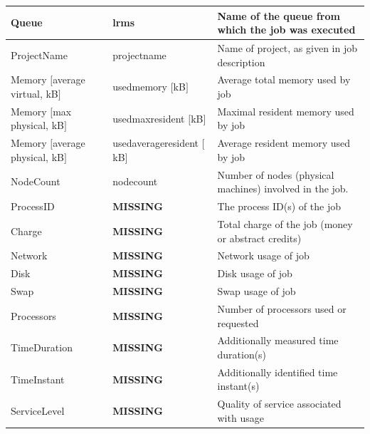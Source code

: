 \documentclass{article}                            %
\begin{document}
\begin{tabular}{|p{}|p{}|p{}|}
\hline
Queue&
lrms&
Name of the queue from which the job was executed\\
\hline
ProjectName&
projectname&
Name of project, as given in job description\\
\hline
Memory\newline
$[$average virtual, kB$]$&
usedmemory $[$kB$]$&
Average total memory used by job\\
\hline
Memory\newline
$[$max physical, kB$]$&
usedmaxresident $[$kB$]$&
Maximal resident memory used by job\\
\hline
Memory\newline
$[$average physical, kB$]$&
usedaverageresident $[$kB$]$&
Average resident memory used by job\\
\hline
NodeCount&
nodecount&
Number of nodes (physical machines) involved in the job.\\
\hline
ProcessID&
\textbf{MISSING}&
The process ID(s) of the job\\
\hline
Charge&
\textbf{MISSING}&
Total charge of the job (money or abstract credits)\\
\hline
Network&
\textbf{MISSING}&
Network usage of job\\
\hline
Disk&
\textbf{MISSING}&
Disk usage of job\\
\hline
Swap&
\textbf{MISSING}&
Swap usage of job\\
\hline
Processors&
\textbf{MISSING}&
Number of processors used or requested\\
\hline
TimeDuration&
\textbf{MISSING}&
Additionally measured time duration(s)\\
\hline
TimeInstant&
\textbf{MISSING}&
Additionally identified time instant(s)\\
\hline
ServiceLevel&
\textbf{MISSING}&
Quality of service associated with usage\\



\hline
\end{tabular}







\end{document}
